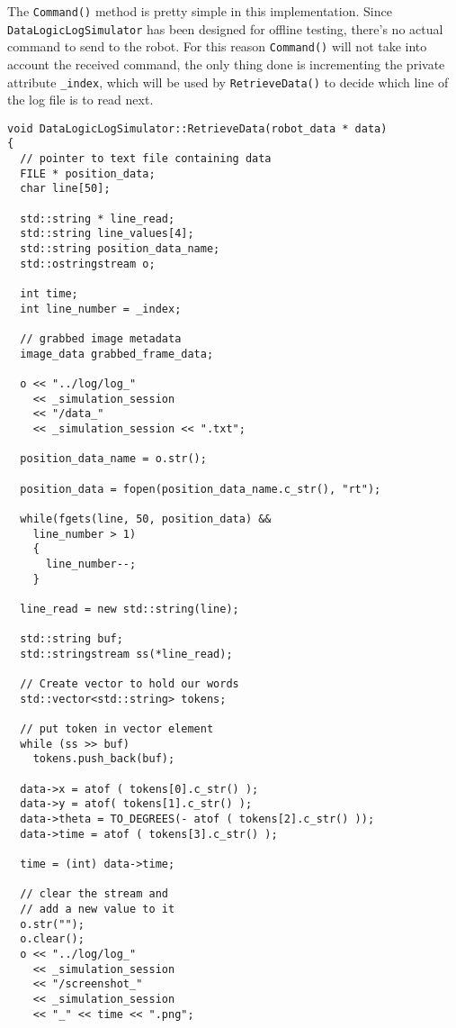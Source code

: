 The \texttt{Command()} method is pretty simple in this 
implementation. Since \texttt{DataLogicLogSimulator} has been designed 
for offline testing, there's no actual command to send to the robot.
For this reason \texttt{Command()} will not take into account
the received command, the only thing done is 
incrementing the private attribute \texttt{\_index}, which 
will be used by \texttt{RetrieveData()} to decide which line 
of the log file is to read next.
\\
\begin{lstlisting}[caption={\texttt{DataLogicLogSimulator::RetrieveData()} method},
    label={code:datalogiclogsimulator:retrievedata}]
void DataLogicLogSimulator::RetrieveData(robot_data * data)
{
  // pointer to text file containing data
  FILE * position_data;
  char line[50];
  
  std::string * line_read;
  std::string line_values[4];
  std::string position_data_name;
  std::ostringstream o;
  
  int time;
  int line_number = _index;

  // grabbed image metadata
  image_data grabbed_frame_data;
  
  o << "../log/log_" 
    << _simulation_session 
    << "/data_" 
    << _simulation_session << ".txt";

  position_data_name = o.str();

  position_data = fopen(position_data_name.c_str(), "rt");

  while(fgets(line, 50, position_data) &&
	line_number > 1)
    {
      line_number--;
    }

  line_read = new std::string(line);

  std::string buf;
  std::stringstream ss(*line_read);

  // Create vector to hold our words
  std::vector<std::string> tokens;
  
  // put token in vector element
  while (ss >> buf)
    tokens.push_back(buf);

  data->x = atof ( tokens[0].c_str() );
  data->y = atof( tokens[1].c_str() );
  data->theta = TO_DEGREES(- atof ( tokens[2].c_str() ));
  data->time = atof ( tokens[3].c_str() );

  time = (int) data->time;

  // clear the stream and 
  // add a new value to it
  o.str("");
  o.clear();
  o << "../log/log_" 
    << _simulation_session 
    << "/screenshot_" 
    << _simulation_session 
    << "_" << time << ".png";


\end{lstlisting}
